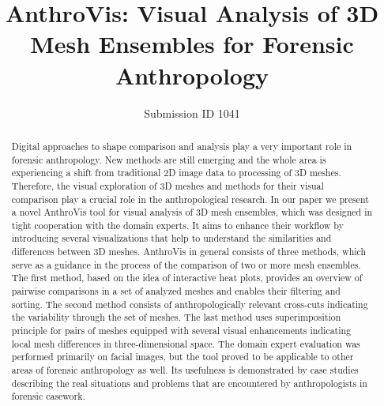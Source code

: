 \documentclass[final,5p,times]{elsarticle}
\begin{document}
\begin{frontmatter}


\title{AnthroVis: Visual Analysis of 3D Mesh Ensembles for Forensic Anthropology}

\author{Submission ID 1041}
\address{}


\begin{abstract}
Digital approaches to shape comparison and analysis play a very important role in forensic anthropology. New methods are still emerging and the whole area is experiencing a shift from traditional 2D image data to processing of 3D meshes. Therefore, the visual exploration of 3D meshes and methods for their visual comparison play a crucial role in the anthropological research. In our paper we present a novel AnthroVis tool for visual analysis of 3D mesh ensembles, which was designed in tight cooperation with the domain experts. It aims to enhance their workflow by introducing several visualizations that help to understand the similarities and differences between 3D meshes. AnthroVis in general consists of three methods, which serve as a guidance in the process of the comparison of two or more mesh ensembles. The first method, based on the idea of interactive heat plots, provides an overview of pairwise comparisons in a set of analyzed meshes and enables their filtering and sorting. The second method consists of anthropologically relevant cross-cuts indicating the variability through the set of meshes. The last method uses superimposition principle for pairs of meshes equipped with several visual enhancements indicating local mesh differences in three-dimensional space. The domain expert evaluation was performed primarily on facial images, but the tool proved to be applicable to other areas of forensic anthropology as well. Its usefulness is demonstrated by case studies describing the real situations and problems that are encountered by anthropologists in forensic casework.
\end{abstract}



\end{frontmatter}
\end{document}
